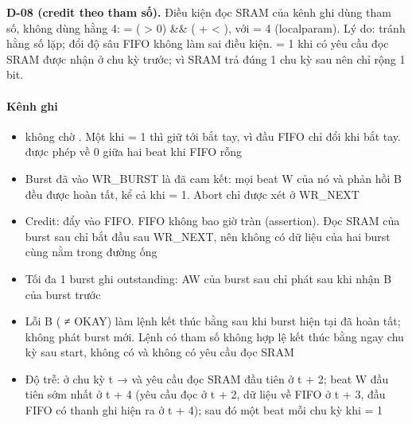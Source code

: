 \documentclass[10pt,a4paper]{article}
\begin{document}
\begin{notebox}
\textbf{D-08 (credit theo tham số).} Điều kiện đọc SRAM của kênh ghi dùng tham số, không dùng hằng 4:  = ( > 0) \&\& ( +  < ), với  = 4 (localparam). Lý do: tránh hằng số lặp; đổi độ sâu FIFO không làm sai điều kiện.  = 1 khi có yêu cầu đọc SRAM được nhận ở chu kỳ trước; vì SRAM trả đúng 1 chu kỳ sau nên  chỉ rộng 1 bit.
\end{notebox}

\paragraph{Kênh ghi}
\begin{itemize}
\item {} không chờ . Một khi  = 1 thì giữ tới bắt tay, vì đầu FIFO chỉ đổi khi bắt tay.  được phép về 0 giữa hai beat khi FIFO rỗng
\item Burst đã vào WR\_BURST là đã cam kết: mọi beat W của nó và phản hồi B đều được hoàn tất, kể cả khi  = 1. Abort chỉ được xét ở WR\_NEXT
\item Credit:  đẩy  vào FIFO. FIFO không bao giờ tràn (assertion). Đọc SRAM của burst sau chỉ bắt đầu sau WR\_NEXT, nên không có dữ liệu của hai burst cùng nằm trong đường ống
\item Tối đa 1 burst ghi outstanding: AW của burst sau chỉ phát sau khi nhận B của burst trước
\item Lỗi B ( ≠ OKAY) làm lệnh kết thúc bằng  sau khi burst hiện tại đã hoàn tất; không phát burst mới. Lệnh có tham số không hợp lệ kết thúc bằng  ngay chu kỳ sau start, không có  và không có yêu cầu đọc SRAM
\item Độ trễ:  ở chu kỳ t →  và yêu cầu đọc SRAM đầu tiên ở t + 2; beat W đầu tiên sớm nhất ở t + 4 (yêu cầu đọc ở t + 2, dữ liệu về FIFO ở t + 3, đầu FIFO có thanh ghi hiện ra ở t + 4); sau đó một beat mỗi chu kỳ khi  = 1
\end{itemize}
\end{document}
